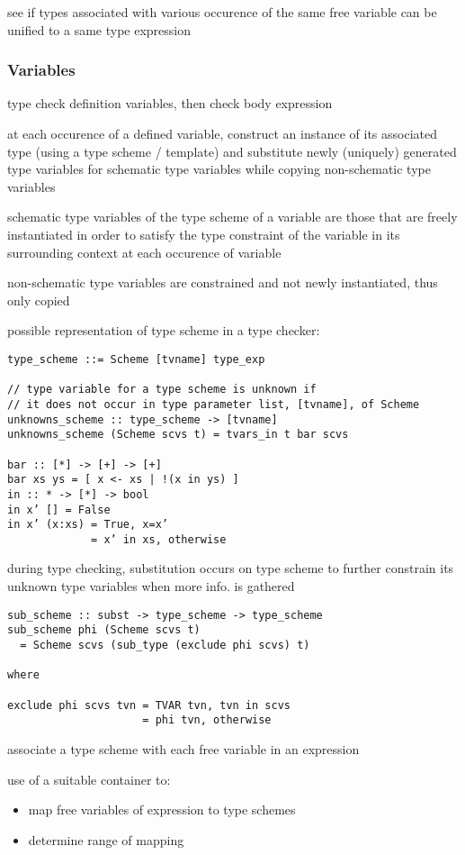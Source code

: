 \documentclass[8pt]{extarticle}
\begin{document}
\begin{multicols*}{2}
see if types associated with various occurence of the same free variable can be unified to a same type expression

\subsubsection{Variables}
type check definition variables, then check body expression

at each occurence of a defined variable, construct an instance of its associated type (using a type scheme / template) and substitute newly (uniquely) generated type variables for schematic type variables while copying non-schematic type variables

schematic type variables of the type scheme of a variable are those that are freely instantiated in order to satisfy the type constraint of the variable in its surrounding context at each occurence of variable

non-schematic type variables are constrained and not newly instantiated, thus only copied

possible representation of type scheme in a type checker:
\begin{verbatim}
type_scheme ::= Scheme [tvname] type_exp

// type variable for a type scheme is unknown if
// it does not occur in type parameter list, [tvname], of Scheme
unknowns_scheme :: type_scheme -> [tvname]
unknowns_scheme (Scheme scvs t) = tvars_in t bar scvs

bar :: [*] -> [+] -> [+]
bar xs ys = [ x <- xs | !(x in ys) ]
in :: * -> [*] -> bool
in x’ [] = False
in x’ (x:xs) = True, x=x’
             = x’ in xs, otherwise
\end{verbatim}

during type checking, substitution occurs on type scheme to further constrain its unknown type variables when more info. is gathered

\begin{verbatim}
sub_scheme :: subst -> type_scheme -> type_scheme
sub_scheme phi (Scheme scvs t)
  = Scheme scvs (sub_type (exclude phi scvs) t)

where

exclude phi scvs tvn = TVAR tvn, tvn in scvs
                     = phi tvn, otherwise
\end{verbatim}

associate a type scheme with each free variable in an expression

use of a suitable container to:
\begin{itemize}
\item map free variables of expression to type schemes
\item determine range of mapping
\end{itemize}


\end{multicols*}
\end{document}
